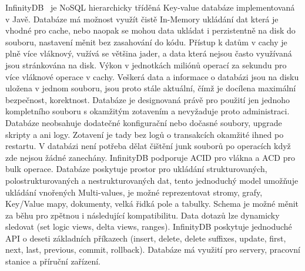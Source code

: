 \documentclass[czech,bachelor,dept460,male,csharp,cpdeclaration]{diploma}
\begin{document}
	InfinityDB~\cite{infinitydb} je NoSQL hierarchicky tříděná Key-value databáze implementovaná v Javě. Databáze má možnost využít čistě In-Memory ukládání dat která je vhodné pro cache, nebo naopak se mohou data ukládat i perzistentně na disk do souboru, nastavení měnit bez zasahování do kódu. Přístup k datům v cachy je plně více vláknový, vužívá se většina jader, a data která nejsou často využívaná jsou stránkována na disk. Výkon v jednotkách miliónů operací za sekundu pro více vláknové operace v cachy. Veškerá data a informace o databázi jsou na disku uložena v jednom souboru, jsou proto stále aktuální, čímž je docílena maximální bezpečnost, korektnost. Databáze je designovaná právě pro použití jen jednoho kompletního souboru s okamžitým zotavením a nevyžaduje proto administraci. Databáze neobsahuje dodatečné konfigurační nebo dočasné soubory, upgrade skripty a ani logy. Zotavení je tady bez logů o transakcích okamžité ihned po restartu. V databázi není potřeba dělat čištění junk souborů po operacích když zde nejsou žádné zanechány. InfinityDB podporuje ACID pro vlákna a ACD pro bulk operace. Databáze poskytuje prostor pro ukládání strukturovaných, polostrukturovaných a nestrukturovaných dat, tento jednoduchý model umožňuje ukládání vnořených Multi-values, je možné reprezentovat stromy, grafy, Key/Value mapy, dokumenty, velká řidká pole a tabulky. Schema je možné měnit za běhu pro zpětnou i následující kompatibilitu. Data dotazů lze dynamicky sledovat (set logic views, delta views, ranges). InfinityDB poskytuje jednoduché API o deseti základních příkazech (insert, delete, delete suffixes, update, first, next, last, previous, commit, rollback). Databáze má využití pro servery, pracovní stanice a příruční zařízení.
\end{document}
